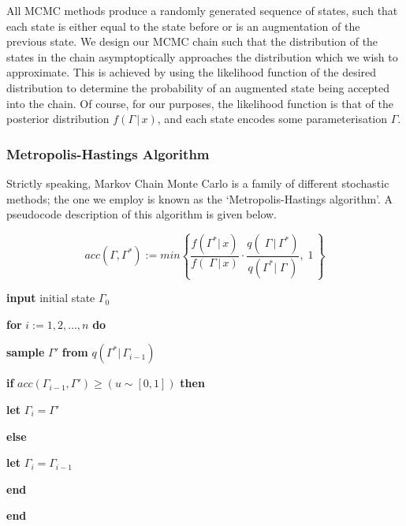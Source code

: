 \documentclass[10pt,journal,compsoc]{IEEEtran}
\begin{document}
All MCMC methods produce a randomly generated sequence of states, such that each state is either equal to the state before or is an augmentation of the previous state. We design our MCMC chain such that the distribution of the states in the chain asymptoptically approaches the distribution which we wish to approximate. This is achieved by using the likelihood function of the desired distribution to determine the probability of an augmented state being accepted into the chain. Of course, for our purposes, the likelihood function is that of the posterior distribution $f(\Gamma\,|\,x)$, and each state encodes some parameterisation $\Gamma$.  


\subsubsection{Metropolis-Hastings Algorithm}

Strictly speaking, Markov Chain Monte Carlo is a family of different stochastic methods; the one we employ is known as the `Metropolis-Hastings algorithm'. A pseudocode description of this algorithm is given below.

\begin{equation*}
acc(\Gamma, \Gamma^*) := min\left\{\frac{f(\Gamma^*|\,x)}{f(\;\Gamma\,|\,x)} \cdot \frac{q(\;\Gamma\,|\,\Gamma^*)}{q(\Gamma^*|\;\Gamma\,)},\;1\,\right\}
\end{equation*}

\indent\textbf{input} initial state $\Gamma_0$

\indent\textbf{for} $i := 1, 2, \ldots , n$ \textbf{do}



\indent\indent\textbf{sample} $\Gamma'$ \textbf{from} $q(\Gamma^*|\,\Gamma_{i-1})$

\indent\indent\textbf{if} $acc(\Gamma_{i-1}, \Gamma') \ge (u \sim [0, 1])$ \textbf{then}

\indent\indent\indent\textbf{let} $\Gamma_i = \Gamma'$

\indent\indent\textbf{else}

\indent\indent\indent\textbf{let} $\Gamma_i = \Gamma_{i-1}$

\indent\indent\textbf{end}

\indent\textbf{end}

\vspace{0.5cm}
\end{document}
